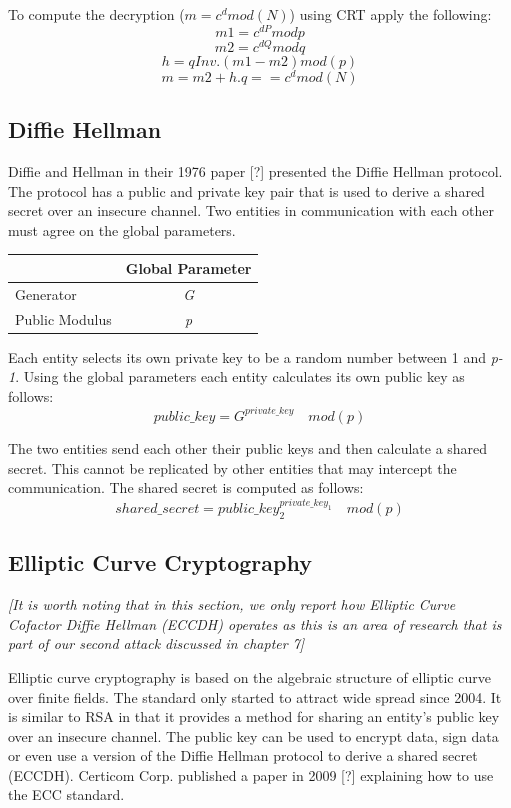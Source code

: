 \documentclass[bsc,frontabs,twoside,singlespacing,parskip,deptreport]{infthesis}     %
\begin{document}
To compute the decryption ($m= c^d mod(N)$) using CRT apply the following:
$$m1 = c^{dP} mod p$$
$$m2 = c^{dQ} mod q$$
$$h = qInv.(m1 - m2) mod (p)$$
$$ m = m2 + h.q  == c^d mod (N)$$


\subsection{Diffie Hellman}
Diffie and Hellman in their 1976 paper [?] presented the Diffie Hellman protocol. The protocol has a public and private key pair that is used to derive a shared secret over an insecure channel. Two entities in communication with each other must agree on the global parameters.

\begin{table}[H]
\begin{tabular}{|l|c|}
\hline
 & Global Parameter\\
\hline
Generator & \textit{G}\\
\hline
Public Modulus & \textit{p}\\
\hline
\end{tabular}
\end{table}

Each entity selects its own private key to be a random number between 1 and \textit{p-1}. Using the global parameters each entity calculates its own public key as follows:
$$ public\_key = G^{private\_key} \quad mod (p)$$

The two entities send each other their public keys and then calculate a shared secret. This cannot be replicated by other entities that may intercept the communication. The shared secret is computed as follows:
$$ shared\_secret = public\_key_2^{private\_key_1} \quad mod (p) $$

\subsection{Elliptic Curve Cryptography}
\textit{[It is worth noting that in this section, we only report how Elliptic Curve Cofactor Diffie Hellman (ECCDH) operates as this is an area of research that is part of our second attack discussed in chapter 7]}

Elliptic curve cryptography is based on the algebraic structure of elliptic curve over finite fields. The standard only started to attract wide spread since 2004. It is similar to RSA in that it provides a method for sharing an entity's public key over an insecure channel. The public key can be used to encrypt data, sign data or even use a version of the Diffie Hellman protocol to derive a shared secret (ECCDH). Certicom Corp. published a paper in 2009 [?] explaining how to use the ECC standard.
\end{document}
